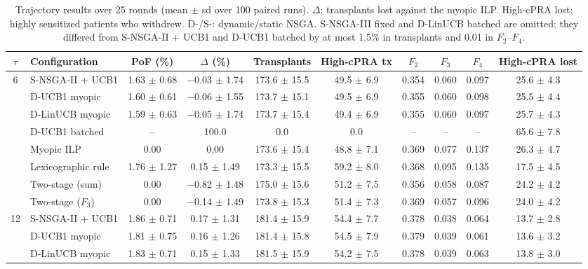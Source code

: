 \documentclass[journal]{IEEEtran}
\begin{document}
\begin{table}[!htbp]
\caption{Trajectory results over 25 rounds (mean $\pm$ sd over 100
paired runs). $\Delta$: transplants lost against the myopic ILP.
High-cPRA lost: highly sensitized patients who withdrew.
D-/S-: dynamic/static NSGA. S-NSGA-III fixed and D-LinUCB batched are
omitted; they differed from S-NSGA-II + UCB1 and D-UCB1 batched by at
most 1.5\% in transplants and 0.01 in $F_2$--$F_4$.}
\label{tab:main}
\begin{tabular}{clcccccccc}
\toprule
$\tau$ & Configuration & PoF (\%) & $\Delta$ (\%) & Transplants
 & High-cPRA tx & $F_2$ & $F_3$ & $F_4$ & High-cPRA lost \\
\midrule
6 & S-NSGA-II + UCB1   & 1.63 $\pm$ 0.68 & $-$0.03 $\pm$ 1.74 & 173.6 $\pm$ 15.5 & 49.5 $\pm$ 6.9 & 0.354 & 0.060 & 0.097 & 25.6 $\pm$ 4.3 \\
 & D-UCB1 myopic      & 1.60 $\pm$ 0.61 & $-$0.06 $\pm$ 1.55 & 173.7 $\pm$ 15.1 & 49.5 $\pm$ 6.9 & 0.355 & 0.060 & 0.098 & 25.5 $\pm$ 4.4 \\
 & D-LinUCB myopic    & 1.59 $\pm$ 0.63 & $-$0.05 $\pm$ 1.74 & 173.7 $\pm$ 15.4 & 49.4 $\pm$ 6.9 & 0.355 & 0.060 & 0.097 & 25.7 $\pm$ 4.3 \\
 & D-UCB1 batched     & --              & 100.0              & 0.0              & 0.0            & --    & --    & --    & 65.6 $\pm$ 7.8 \\
 & Myopic ILP         & 0.00            & 0.00               & 173.6 $\pm$ 15.4 & 48.8 $\pm$ 7.1 & 0.369 & 0.077 & 0.137 & 26.3 $\pm$ 4.7 \\
 & Lexicographic rule & 1.76 $\pm$ 1.27 & 0.15 $\pm$ 1.49    & 173.3 $\pm$ 15.5 & 59.2 $\pm$ 8.0 & 0.368 & 0.095 & 0.135 & 17.5 $\pm$ 4.5 \\
 & Two-stage (sum)    & 0.00            & $-$0.82 $\pm$ 1.48 & 175.0 $\pm$ 15.6 & 51.2 $\pm$ 7.5 & 0.356 & 0.058 & 0.087 & 24.2 $\pm$ 4.2 \\
 & Two-stage ($F_3$)  & 0.00            & $-$0.14 $\pm$ 1.49 & 173.8 $\pm$ 15.3 & 51.4 $\pm$ 7.3 & 0.369 & 0.057 & 0.096 & 24.0 $\pm$ 4.2 \\
\midrule
12 & S-NSGA-II + UCB1   & 1.86 $\pm$ 0.71 & 0.17 $\pm$ 1.31    & 181.4 $\pm$ 15.9 & 54.4 $\pm$ 7.7 & 0.378 & 0.038 & 0.064 & 13.7 $\pm$ 2.8 \\
 & D-UCB1 myopic      & 1.81 $\pm$ 0.75 & 0.16 $\pm$ 1.26    & 181.4 $\pm$ 15.8 & 54.5 $\pm$ 7.9 & 0.379 & 0.039 & 0.061 & 13.6 $\pm$ 3.2 \\
 & D-LinUCB myopic    & 1.83 $\pm$ 0.71 & 0.15 $\pm$ 1.33    & 181.5 $\pm$ 15.9 & 54.2 $\pm$ 7.5 & 0.378 & 0.039 & 0.063 & 13.8 $\pm$ 3.0 \\

\end{tabular}
\end{table}
\end{document}
